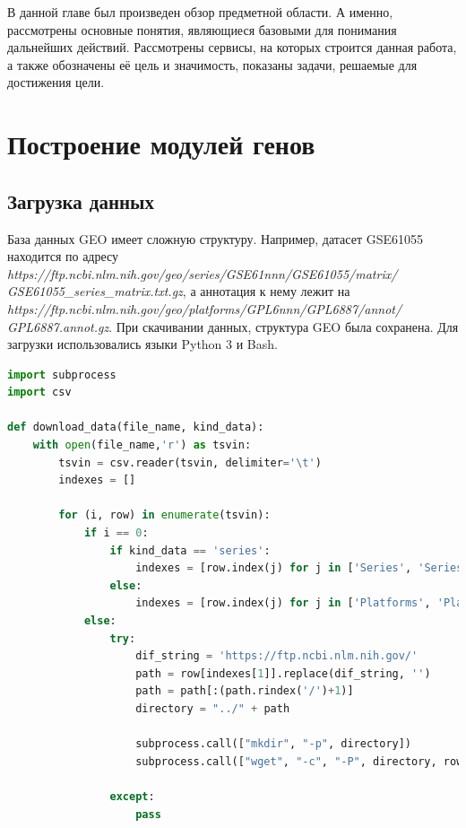 \documentclass[times,specification,annotation]{itmo-student-thesis}
\begin{document}
\chapterconclusion

В данной главе был произведен обзор предметной области. А именно, рассмотрены основные понятия, являющиеся базовыми для понимания дальнейших действий. Рассмотрены сервисы, на которых строится данная работа, а также обозначены её цель и значимость, показаны задачи, решаемые для достижения цели. 
\finishrelatedwork

\chapter{Построение модулей генов}

\section{Загрузка данных}

База данных GEO имеет сложную структуру. Например, датасет GSE61055 находится по адресу \textit{https://ftp.ncbi.nlm.nih.gov/geo/series/GSE61nnn/GSE61055/matrix/} \textit{GSE61055\_series\_matrix.txt.gz}, а аннотация к нему лежит на \textit{https://ftp.ncbi.nlm.nih.gov/geo/platforms/GPL6nnn/GPL6887/annot/} \textit{GPL6887.annot.gz}. При скачивании данных, структура GEO была сохранена. Для загрузки использовались языки Python 3 и Bash. 

\begin{lstlisting}[float=!h, caption={Загрузка данных из GEO.}, captionpos=b, label={downloadGEO}, basicstyle=\footnotesize, language=Python]
import subprocess
import csv

def download_data(file_name, kind_data): 
    with open(file_name,'r') as tsvin:
        tsvin = csv.reader(tsvin, delimiter='\t')
        indexes = []
        
        for (i, row) in enumerate(tsvin):
            if i == 0:
                if kind_data == 'series':
                    indexes = [row.index(j) for j in ['Series', 'Series_url']]
                else:
                    indexes = [row.index(j) for j in ['Platforms', 'Platforms_url']]
            else:    
                try:
                    dif_string = 'https://ftp.ncbi.nlm.nih.gov/'
                    path = row[indexes[1]].replace(dif_string, '')
                    path = path[:(path.rindex('/')+1)]
                    directory = "../" + path

                    subprocess.call(["mkdir", "-p", directory])
                    subprocess.call(["wget", "-c", "-P", directory, row[indexes[1]]])

                except:
                    pass

\end{lstlisting}
\end{document}
